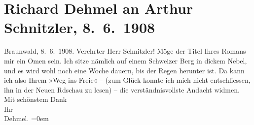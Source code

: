 

         \newcommand{\erwaehnteOrte}{Orte: Braunwald, Schweiz, Wien}
         \newcommand{\erwaehnteWerke}{Werke: Der Weg ins Freie. Roman, Die neue Rundschau}
               \section[Richard Dehmel an Arthur Schnitzler, 8. 6. 1908]{ Richard Dehmel an Arthur Schnitzler, 8. 6. 1908}\nopagebreak{}\rehead{ }\begin{ledgroupsized}[t]{13cm}\normalsize\beginnumbering \toendnotes[C]{\smallbreak\pagebreak[2]} 
\toendnotes[C]{\smallbreak}\pstart
           \raggedleft{}{\pb}Braunwald,
                        8. 6. 1908.\pend
           \pstart{}Verehrter Herr Schnitzler!\pend\pstart
           Möge der Titel Ihres Romans
                    mir ein Omen sein. Ich sitze nämlich auf einem Schweizer Berg in dickem Nebel, und es wird wohl noch eine Woche
                    dauern, bis der Regen herunter ist. Da kann ich also Ihrem »Weg ins Freie« – (zum Glück konnte ich mich nicht
                    entschliessen, ihn in der Neuen Rdschau zu
                    lesen) – die verständnisvollste Andacht widmen.\pend
           \pstart
           Mit schönstem Dank{\\[\baselineskip]}Ihr{\\[\baselineskip]}\spacefill\mbox{Dehmel.}\pend
           \leftskip=0em{}
         
         \endnumbering{}\end{ledgroupsized}  \newcommand{\dateiname}{L01775}\newcommand{\titel}{Richard Dehmel an Arthur Schnitzler, 8. 6. 1908}\newcommand{\editorInnen}{ Martin Anton Müller und Gerd-Hermann Susen}
      